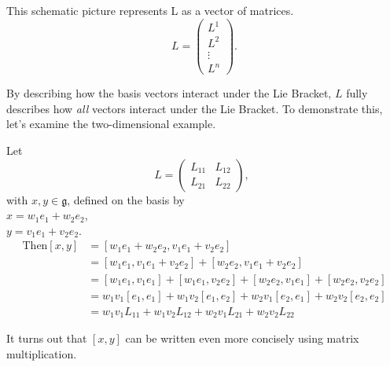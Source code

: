 \documentclass[11 pt]{article}
\newcommand{\br}[2]{\left[#1,#2\right]}
\newcommand{\fg}{\mathfrak{g}}
\begin{document}
    \vspace{3.15 cm}
    This schematic picture represents L as a vector of matrices.
    $$
    L = \begin{pmatrix}
        L^1 \\ L^2 \\ \vdots \\ L^n
    \end{pmatrix}.
    $$

    By describing how the basis vectors interact under the Lie Bracket,
    $L$ fully describes how \emph{all} vectors interact under the Lie Bracket.
    To demonstrate this, let's examine the two-dimensional example.

    \begin{example}
        Let
        $$
         L = \begin{pmatrix}
                L_{11} & L_{12} \\
                L_{21} & L_{22}
             \end{pmatrix},\ \ 
        $$
        with $x,y \in \fg$, defined on the basis by
        \\$x=w_1e_1 + w_2e_2$,
        \\$y=v_1e_1 + v_2e_2$.
        \begin{align*}
            \text{Then} \br{x}{y} &= \br{w_1e_1 + w_2e_2}{v_1e_1 + v_2e_2}
            \\&= \br{w_1e_1}{v_1e_1 + v_2e_2} + \br{w_2e_2}{v_1e_1 + v_2e_2}
            \\&= \br{w_1e_1}{v_1e_1} + \br{w_1e_1}{v_2e_2}+ \br{w_2e_2}{v_1e_1} + \br{w_2e_2}{v_2e_2}
            \\&= w_1v_1\br{e_1}{e_1} + w_1v_2\br{e_1}{e_2}+ w_2v_1\br{e_2}{e_1} + w_2v_2\br{e_2}{e_2}
            \\&= w_1v_1L_{11} + w_1v_2L_{12} + w_2v_1L_{21}+ w_2v_2L_{22}
        \end{align*}
    \end{example}
    It turns out that $\br{x}{y}$ can be written even more concisely using
    matrix multiplication.
\end{document}
